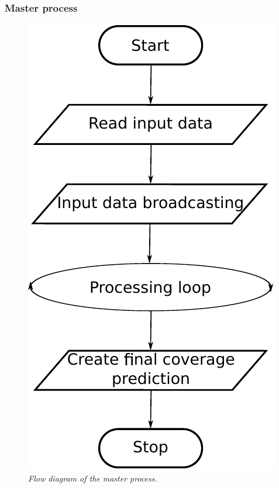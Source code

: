 \subsubsection{Master process \label{sub:04-Master-process}}

\begin{figure}
\begin{minipage}[t]{0.49\textwidth}%
\centering

\includegraphics[width=0.55\columnwidth]{04-framework_design_and_implementation/img/master_process_flow_diagram}

\caption{\textit{\emph{Flow diagram of the master process.\label{fig:04-Master_process_flow_diagram}}}}
%
\end{minipage}\hfill{}%
\begin{minipage}[t]{0.49\textwidth}%
\centering


\end{minipage}
\end{figure}
